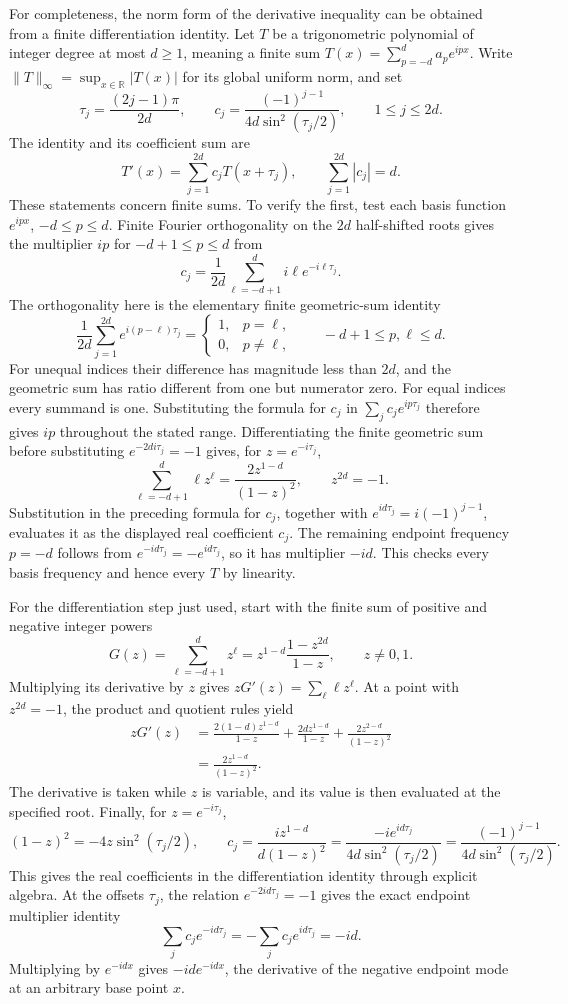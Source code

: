 For completeness, the norm form of the derivative inequality can be
obtained from a finite differentiation identity. Let $T$ be a
trigonometric polynomial of integer degree at most $d\geq1$, meaning
a finite sum $T(x)=\sum_{p=-d}^d a_p e^{ipx}$. Write
$\|T\|_\infty=\sup_{x\in\mathbb R}|T(x)|$ for its global uniform
norm, and set
\[
 \tau_j=\frac{(2j-1)\pi}{2d},\qquad
 c_j=\frac{(-1)^{j-1}}{4d\sin^2(\tau_j/2)},
 \qquad 1\leq j\leq2d.
\]
The identity and its coefficient sum are
\[
 T'(x)=\sum_{j=1}^{2d}c_jT(x+\tau_j),\qquad
 \sum_{j=1}^{2d}|c_j|=d.
\]
These statements concern finite sums. To verify the first, test each
basis function $e^{ipx}$, $-d\leq p\leq d$. Finite Fourier
orthogonality on the $2d$ half-shifted roots gives the multiplier
$ip$ for $-d+1\leq p\leq d$ from
\[
 c_j=\frac1{2d}\sum_{\ell=-d+1}^d
                  i\ell e^{-i\ell\tau_j}.
\]
The orthogonality here is the elementary finite geometric-sum identity
\[
 \frac1{2d}\sum_{j=1}^{2d}e^{i(p-\ell)\tau_j}
   =\begin{cases}1,&p=\ell,\\0,&p\ne\ell,\end{cases}
 \qquad -d+1\leq p,\ell\leq d.
\]
For unequal indices their difference has magnitude less than $2d$,
and the geometric sum has ratio different from one but numerator
zero. For equal indices every summand is one. Substituting the
formula for $c_j$ in $\sum_j c_j e^{ip\tau_j}$ therefore gives
$ip$ throughout the stated range.
Differentiating the finite geometric sum before substituting
$e^{-2di\tau_j}=-1$ gives, for $z=e^{-i\tau_j}$,
\[
 \sum_{\ell=-d+1}^d\ell z^\ell
           =\frac{2z^{1-d}}{(1-z)^2},\qquad z^{2d}=-1.
\]
Substitution in the preceding formula for $c_j$, together with
$e^{id\tau_j}=i(-1)^{j-1}$, evaluates it as the displayed real
coefficient $c_j$. The remaining endpoint frequency $p=-d$ follows
from $e^{-id\tau_j}=-e^{id\tau_j}$, so it has multiplier $-id$.
This checks every basis frequency and hence every $T$ by linearity.

For the differentiation step just used, start with the finite sum of
positive and negative integer powers
\[
 G(z)=\sum_{\ell=-d+1}^d z^\ell
       =z^{1-d}\frac{1-z^{2d}}{1-z},\qquad z\ne0,1.
\]
Multiplying its derivative by $z$ gives
$zG'(z)=\sum_\ell\ell z^\ell$. At a point with $z^{2d}=-1$,
the product and quotient rules yield
\[
 \begin{aligned}
 zG'(z)
 &=\frac{2(1-d)z^{1-d}}{1-z}
    +\frac{2d z^{1-d}}{1-z}
    +\frac{2z^{2-d}}{(1-z)^2}\\
 &=\frac{2z^{1-d}}{(1-z)^2}.
 \end{aligned}
\]
The derivative is taken while $z$ is variable, and its value is then
evaluated at the specified root. Finally, for $z=e^{-i\tau_j}$,
\[
 (1-z)^2=-4z\sin^2(\tau_j/2),\qquad
 c_j=\frac{i z^{1-d}}{d(1-z)^2}
     =\frac{-i e^{id\tau_j}}{4d\sin^2(\tau_j/2)}
     =\frac{(-1)^{j-1}}{4d\sin^2(\tau_j/2)}.
\]
This gives the real coefficients in the differentiation identity
through explicit algebra. At the offsets $\tau_j$, the relation
$e^{-2id\tau_j}=-1$ gives the exact endpoint multiplier identity
\[
 \sum_j c_j e^{-id\tau_j}
       =-\sum_j c_j e^{id\tau_j}=-id.
\]
Multiplying by $e^{-idx}$ gives $-id e^{-idx}$, the derivative of
the negative endpoint mode at an arbitrary base point $x$.

